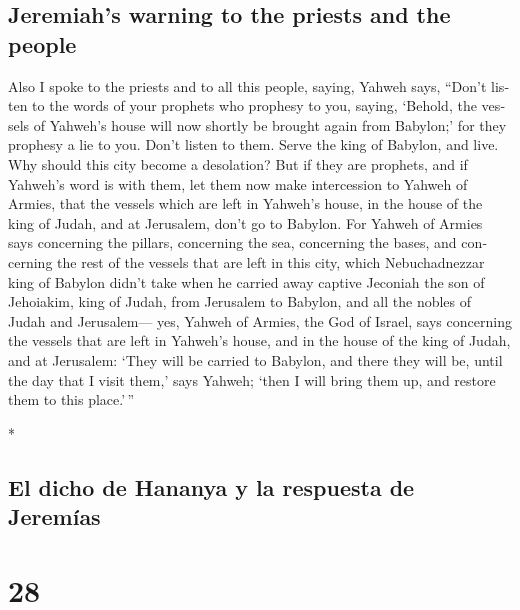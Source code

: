 \begin{paracol}{2}
\begin{otherlanguage}{english}
\hypertarget{jeremiahs-warning-to-the-priests-and-the-people}{%
\subsection{Jeremiah's warning to the priests and the
people}\label{jeremiahs-warning-to-the-priests-and-the-people}}

 Also I spoke to the priests and to all this people,
saying, Yahweh says, ``Don't listen to the words of your prophets who
prophesy to you, saying, `Behold, the vessels of Yahweh's house will now
shortly be brought again from Babylon;' for they prophesy a lie to you.
 Don't listen to them. Serve the king of Babylon, and
live. Why should this city become a desolation?  But if
they are prophets, and if Yahweh's word is with them, let them now make
intercession to Yahweh of Armies, that the vessels which are left in
Yahweh's house, in the house of the king of Judah, and at Jerusalem,
don't go to Babylon.  For Yahweh of Armies says
concerning the pillars, concerning the sea, concerning the bases, and
concerning the rest of the vessels that are left in this city,
 which Nebuchadnezzar king of Babylon didn't take when he
carried away captive Jeconiah the son of Jehoiakim, king of Judah, from
Jerusalem to Babylon, and all the nobles of Judah and Jerusalem---
 yes, Yahweh of Armies, the God of Israel, says
concerning the vessels that are left in Yahweh's house, and in the house
of the king of Judah, and at Jerusalem:  `They will be
carried to Babylon, and there they will be, until the day that I visit
them,' says Yahweh; `then I will bring them up, and restore them to this
place.'\,''

\end{otherlanguage}

\switchcolumn[0]*

\hypertarget{el-dicho-de-hananya-y-la-respuesta-de-jeremuxedas}{%
\subsection{El dicho de Hananya y la respuesta de
Jeremías}\label{el-dicho-de-hananya-y-la-respuesta-de-jeremuxedas}}

\hypertarget{section-54}{%
\section{28}\label{section-54}}


\end{paracol}
